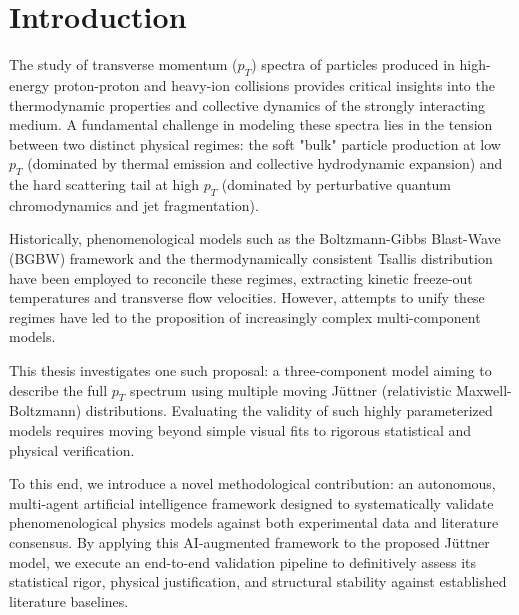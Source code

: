 \chapter{Introduction}
\label{ch:introduction}

The study of transverse momentum ($p_T$) spectra of particles produced in high-energy proton-proton and heavy-ion collisions provides critical insights into the thermodynamic properties and collective dynamics of the strongly interacting medium. A fundamental challenge in modeling these spectra lies in the tension between two distinct physical regimes: the soft "bulk" particle production at low $p_T$ (dominated by thermal emission and collective hydrodynamic expansion) and the hard scattering tail at high $p_T$ (dominated by perturbative quantum chromodynamics and jet fragmentation). 

Historically, phenomenological models such as the Boltzmann-Gibbs Blast-Wave (BGBW) framework and the thermodynamically consistent Tsallis distribution have been employed to reconcile these regimes, extracting kinetic freeze-out temperatures and transverse flow velocities. However, attempts to unify these regimes have led to the proposition of increasingly complex multi-component models. 

This thesis investigates one such proposal: a three-component model aiming to describe the full $p_T$ spectrum using multiple moving J\"uttner (relativistic Maxwell-Boltzmann) distributions. Evaluating the validity of such highly parameterized models requires moving beyond simple visual fits to rigorous statistical and physical verification.

To this end, we introduce a novel methodological contribution: an autonomous, multi-agent artificial intelligence framework designed to systematically validate phenomenological physics models against both experimental data and literature consensus. By applying this AI-augmented framework to the proposed J\"uttner model, we execute an end-to-end validation pipeline to definitively assess its statistical rigor, physical justification, and structural stability against established literature baselines.
